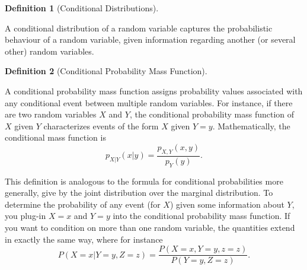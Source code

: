 \documentclass[
  letterpaper,
  DIV=11,
  numbers=noendperiod]{scrreprt}
\theoremstyle{definition}
\newtheorem{definition}{Definition}[chapter]
\theoremstyle{definition}
\theoremstyle{definition}
\theoremstyle{remark}
\begin{document}
\begin{definition}[Conditional
Distributions]\protect\hypertarget{def-conditional-distribution}{}\label{def-conditional-distribution}

A conditional distribution of a random variable captures the
probabilistic behaviour of a random variable, given information
regarding another (or several other) random variables.

\end{definition}

\begin{definition}[Conditional Probability Mass
Function]\protect\hypertarget{def-conditional-pmf}{}\label{def-conditional-pmf}

A conditional probability mass function assigns probability values
associated with any conditional event between multiple random variables.
For instance, if there are two random variables \(X\) and \(Y\), the
conditional probability mass function of \(X\) given \(Y\) characterizes
events of the form \(X\) given \(Y=y\). Mathematically, the conditional
mass function is \[p_{X|Y}(x|y) = \frac{p_{X,Y}(x,y)}{p_Y(y)}.\]

\end{definition}

This definition is analogous to the formula for conditional
probabilities more generally, give by the joint distribution over the
marginal distribution. To determine the probability of any event (for
\(X\)) given some information about \(Y\), you plug-in \(X=x\) and
\(Y=y\) into the conditional probability mass function. If you want to
condition on more than one random variable, the quantities extend in
exactly the same way, where for instance
\[P(X=x|Y=y,Z=z)=\frac{P(X=x,Y=y,z=z)}{P(Y=y,Z=z)}.\]
\end{document}
